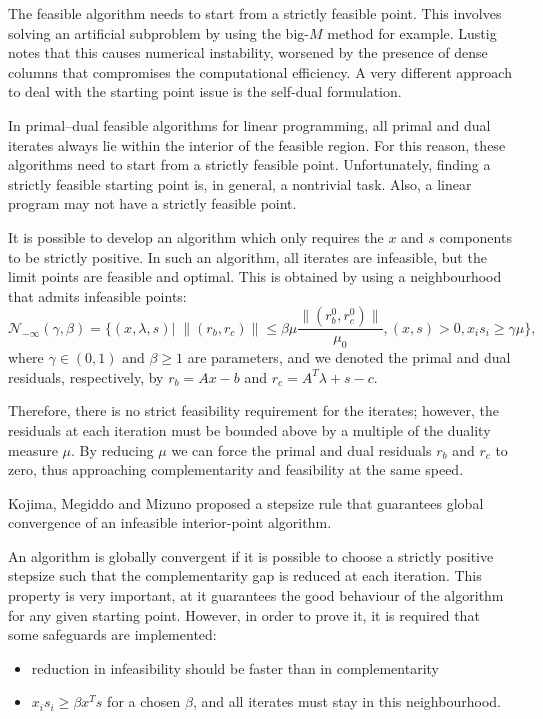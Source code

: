 The feasible algorithm needs to start from a strictly feasible 
point. This involves solving an artificial subproblem by using 
the big-$M$ method for example. Lustig \cite{Lustig91}
notes that this causes numerical instability, worsened 
by the presence of dense columns that compromises the 
computational efficiency. A very different approach to deal 
with the starting point issue is the self-dual formulation.

\hrulefill

In primal--dual feasible algorithms for linear programming, 
all primal and dual iterates always lie within the interior 
of the feasible region. For this reason, these algorithms 
need to start from a strictly feasible point. Unfortunately, 
finding a strictly feasible starting point is, in general, 
a nontrivial task. Also, a linear program may not have a 
strictly feasible point.

It is possible to develop an algorithm which only requires 
the $x$ and $s$ components to be strictly positive. In such 
an algorithm, all iterates are infeasible, but the limit points 
are feasible and optimal. This is obtained by using a 
neighbourhood that admits infeasible points:
\[
\mathcal{N}_{-\infty}(\gamma,\beta) =\{ (x,\lambda,s) | \; \|(r_b,r_c)\| \le \beta\mu \frac{\|(r_b^0,r_c^0)\|}{\mu_0}, (x,s)>0, x_is_i \ge \gamma\mu \},
\]
where $\gamma\in (0,1)$ and $\beta \ge 1$ are parameters, and 
we denoted the primal and dual residuals, respectively, by 
$r_b = Ax-b$ and $r_c = A^T\lambda+s-c$.

Therefore, there is no strict feasibility requirement for 
the iterates; however, the residuals at each iteration must be 
bounded above by a multiple of the duality measure $\mu$. 
By reducing $\mu$ we can force the primal and dual residuals 
$r_b$ and $r_c$ to zero, thus approaching complementarity and 
feasibility at the same speed.

\hrulefill

Kojima, Megiddo and Mizuno \cite{KojimaMegiddoMizuno} proposed 
a stepsize rule that guarantees global convergence of an 
infeasible interior-point algorithm.

An algorithm is globally convergent if it is possible to choose
a strictly positive stepsize such that the complementarity gap
is reduced at each iteration. This property is very important, at it
guarantees the good behaviour of the algorithm for any given starting
point. However, in order to prove it, it is required that some
safeguards are implemented:
\begin{itemize}
\item reduction in infeasibility should be faster than in complementarity
\item $x_i s_i \ge \beta x^Ts$ for a chosen $\beta$, and all iterates must
stay in this neighbourhood.
\end{itemize}

